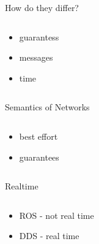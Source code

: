 \documentclass{beamer}
\begin{document}
\begin{frame}{How do they differ?}
	\begin{columns}
		\begin{column}{0.6\textwidth}
			\begin{itemize}
				\item guarantess
                                \item messages
                                \item time
			\end{itemize}
		\end{column}
		\begin{column}{0.4\textwidth}
			\centering
		\end{column}
	\end{columns}
\end{frame}

\begin{frame}{Semantics of Networks}
	\begin{columns}
		\begin{column}{0.6\textwidth}
			\begin{itemize}
				\item best effort
                                \item guarantees
                            
			\end{itemize}
		\end{column}
		\begin{column}{0.4\textwidth}
			\centering
		\end{column}
	\end{columns}
\end{frame}

\begin{frame}{Realtime}
	\begin{columns}
		\begin{column}{0.6\textwidth}
			\begin{itemize}
				\item ROS - not real time
                                \item DDS - real time
			\end{itemize}
		\end{column}
		\begin{column}{0.4\textwidth}
			\centering
		\end{column}
	\end{columns}
\end{frame}
\end{document}
